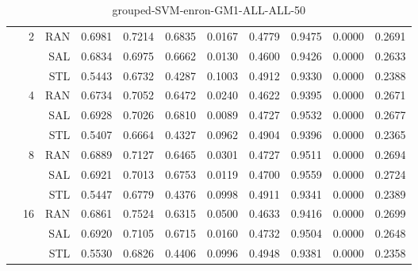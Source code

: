 \begin{center}
\begin{table}[htbp]
\begin{center}
\begin{tabular}{ | r | r | r | r | r | r | r | r | r | r | r |}
 & \multirow{3}{*}{2} & RAN & 0.6981 & 0.7214 & 0.6835 & 0.0167 & 0.4779 & 0.9475 & 0.0000 & 0.2691\\ \cline{3-11}
 &   & SAL & 0.6834 & 0.6975 & 0.6662 & 0.0130 & 0.4600 & 0.9426 & 0.0000 & 0.2633\\ \cline{3-11}
 &   & STL & 0.5443 & 0.6732 & 0.4287 & 0.1003 & 0.4912 & 0.9330 & 0.0000 & 0.2388\\ \cline{2-11}
 & \multirow{3}{*}{4} & RAN & 0.6734 & 0.7052 & 0.6472 & 0.0240 & 0.4622 & 0.9395 & 0.0000 & 0.2671\\ \cline{3-11}
 &   & SAL & 0.6928 & 0.7026 & 0.6810 & 0.0089 & 0.4727 & 0.9532 & 0.0000 & 0.2677\\ \cline{3-11}
 &   & STL & 0.5407 & 0.6664 & 0.4327 & 0.0962 & 0.4904 & 0.9396 & 0.0000 & 0.2365\\ \cline{2-11}
 & \multirow{3}{*}{8} & RAN & 0.6889 & 0.7127 & 0.6465 & 0.0301 & 0.4727 & 0.9511 & 0.0000 & 0.2694\\ \cline{3-11}
 &   & SAL & 0.6921 & 0.7013 & 0.6753 & 0.0119 & 0.4700 & 0.9559 & 0.0000 & 0.2724\\ \cline{3-11}
 &   & STL & 0.5447 & 0.6779 & 0.4376 & 0.0998 & 0.4911 & 0.9341 & 0.0000 & 0.2389\\ \cline{2-11}
 & \multirow{3}{*}{16} & RAN & 0.6861 & 0.7524 & 0.6315 & 0.0500 & 0.4633 & 0.9416 & 0.0000 & 0.2699\\ \cline{3-11}
 &   & SAL & 0.6920 & 0.7105 & 0.6715 & 0.0160 & 0.4732 & 0.9504 & 0.0000 & 0.2648\\ \cline{3-11}
 &   & STL & 0.5530 & 0.6826 & 0.4406 & 0.0996 & 0.4948 & 0.9381 & 0.0000 & 0.2358\\ \cline{2-11}
\hline
\end{tabular}
\caption{grouped-SVM-enron-GM1-ALL-ALL-50}
\end{center}
 \end{table}
\end{center}

